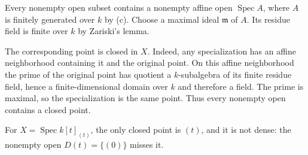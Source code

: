 Every nonempty open subset contains a nonempty affine open $\operatorname{Spec}A$, where $A$ is finitely generated over $k$ by (c). Choose a maximal ideal $\mathfrak m$ of $A$. Its residue field is finite over $k$ by Zariski's lemma.

The corresponding point is closed in $X$. Indeed, any specialization has an affine neighborhood containing it and the original point. On this affine neighborhood the prime of the original point has quotient a $k$-subalgebra of its finite residue field, hence a finite-dimensional domain over $k$ and therefore a field. The prime is maximal, so the specialization is the same point. Thus every nonempty open contains a closed point.

For $X=\operatorname{Spec}k[t]_{(t)}$, the only closed point is $(t)$, and it is not dense: the nonempty open $D(t)=\{(0)\}$ misses it.
